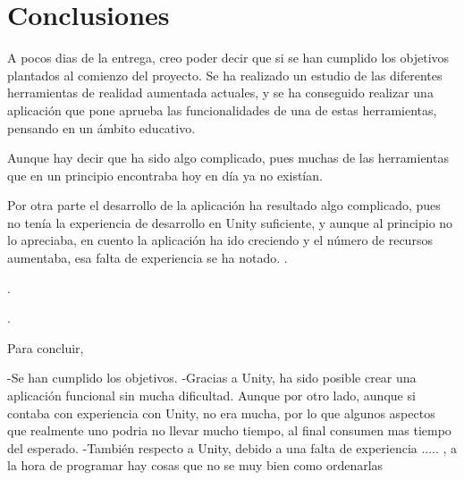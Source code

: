 

\section{Conclusiones}
A pocos dias de la entrega, creo poder decir que si se han cumplido los objetivos plantados al comienzo del proyecto. Se ha realizado un estudio de las diferentes herramientas de realidad aumentada actuales, y se ha conseguido realizar una aplicación que pone aprueba las funcionalidades de una de estas herramientas, pensando en un ámbito educativo.

Aunque hay decir que ha sido algo complicado, pues muchas de las herramientas  que en un principio encontraba hoy en día ya no existían.

Por otra parte el desarrollo de la aplicación ha resultado algo complicado, pues no tenía la experiencia de desarrollo en Unity suficiente, y aunque al principio no lo apreciaba, en cuento la aplicación ha ido creciendo y el número de recursos aumentaba, esa falta de experiencia se ha notado.
.

.

.

 



Para concluir, 

-Se han cumplido los objetivos.
-Gracias a Unity, ha sido posible crear una aplicación funcional sin mucha dificultad.
Aunque por otro lado, aunque si contaba con experiencia con Unity, no era mucha, por lo que algunos aspectos que realmente uno podria no llevar mucho tiempo, al final consumen mas tiempo del esperado.
-También respecto a Unity, debido a una falta de experiencia ..... , a la hora de programar hay cosas que no se muy bien como ordenarlas

